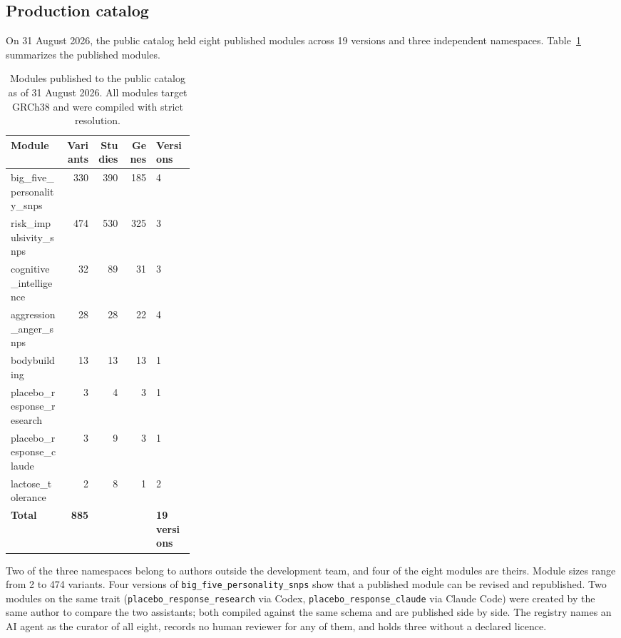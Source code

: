 \documentclass[11pt,a4paper]{article}
\begin{document}
\subsection{Production catalog}

On 31 August 2026, the public catalog held eight published modules
across 19 versions and three independent namespaces. Table~\ref{tab:catalog} summarizes the published modules.

\begin{table}[ht]
\centering
\small
\caption{Modules published to the public catalog as of 31 August 2026.
All modules target GRCh38 and were compiled with strict resolution.}
\label{tab:catalog}
\begin{tabular}{@{}p{0.30\linewidth}rrrl@{}}
\toprule
Module & Variants & Studies & Genes & Versions \\
\midrule
big\_five\_personality\_snps & 330 & 390 & 185 & 4 \\
risk\_impulsivity\_snps  & 474 & 530 & 325 & 3 \\
cognitive\_intelligence & 32  &  89 &  31 & 3 \\
aggression\_anger\_snps  & 28  &  28 &  22 & 4 \\
bodybuilding            & 13  &  13 &  13 & 1 \\
placebo\_response\_research &  3  &   4 &   3 & 1 \\
placebo\_response\_claude & 3 &   9 &   3 & 1 \\
lactose\_tolerance      &  2  &   8 &   1 & 2 \\
\midrule
\textbf{Total}         & \textbf{885} & & & \textbf{19 versions} \\
\bottomrule
\end{tabular}
\end{table}

Two of the three namespaces belong to authors outside the development team,
and four of the eight modules are theirs. Module sizes range from 2 to 474
variants. Four versions of \texttt{big\_five\_personality\_snps} show that a
published module can be revised and republished. Two modules on the same trait
(\texttt{placebo\_response\_research} via Codex, \texttt{placebo\_response\_claude} via
Claude Code) were created by the same author to compare the two assistants;
both compiled against the same schema and are published side by side.
The registry names an AI agent as the curator of all eight, records no
human reviewer for any of them, and holds three without a declared licence.
\end{document}
